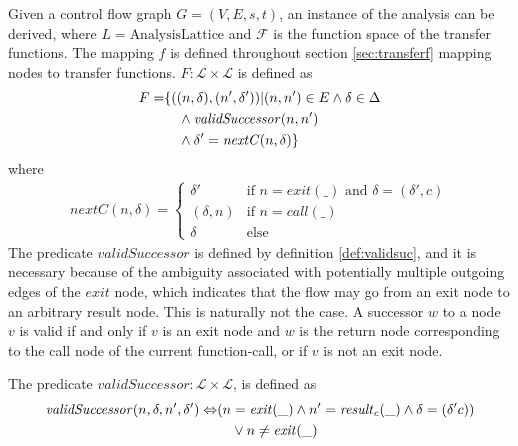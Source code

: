 Given a control flow graph $G = (V,E,s,t)$, an instance of the analysis can be derived, where $L = \text{AnalysisLattice}$ and $\mathcal{F}$ is the function space of the transfer functions. The mapping $f$ is defined throughout section \ref{sec:transferf} mapping nodes to transfer functions. $F : \mathcal{L} \times \mathcal{L}$ is defined as 
\begin{align}
F = &\{((n, \delta), (n', \delta')) | (n,n') \in E \wedge\delta \in \Delta \notag\\
&\quad \wedge \mathit{validSuccessor}(n, n')\notag\\
&\quad \wedge  \delta' = \mathit{nextC}( n, \delta)\}
\end{align} 
where 
\begin{align}
\mathit{nextC}(n,\delta) = 
	\begin{cases}
		\delta' & \text{if $n = \mathit{exit(\_)}$ and $\delta = (\delta', c)$}\\
		(\delta, n) &\text{if }n=\mathit{call}(\_)\\
		\delta &\text{else} 
	\end{cases}
\end{align} The predicate $\mathit{validSuccessor}$ is defined by definition \ref{def:validsuc}, and it is necessary because of the ambiguity associated with potentially multiple outgoing edges of the $\mathit{exit}$ node, which indicates that the flow may go from an exit node to an arbitrary result node. This is naturally not the case. A successor $w$ to a node $v$ is valid if and only if $v$ is an exit node and $w$ is the return node corresponding to the call node of the current function-call, or if $v$ is not an exit node.

\begin{definition}
\label{def:validsuc}
The predicate $\mathit{validSuccessor} : \mathcal{L} \times \mathcal{L}$, is defined as
\begin{align}
\mathit{validSuccessor}(n, \delta, n', \delta') \Leftrightarrow &(n = \mathit{exit}(\_) \wedge n' = \mathit{result}_c(\_) \wedge \delta  = (\delta' c)) \notag\\
&\quad\vee n \neq \mathit{exit}(\_)
\end{align}
\end{definition}


